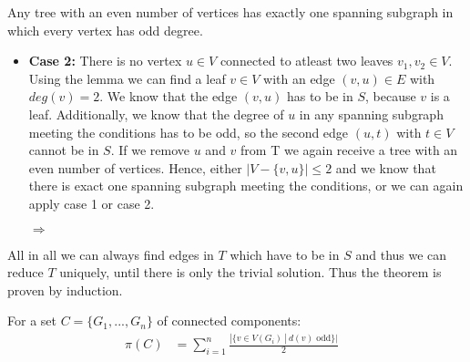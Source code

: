 \documentclass[a4paper]{article}
\begin{document}
\begin{solution}{6}
\begin{theorem}{Any tree with an even number of vertices has exactly one spanning subgraph in which every vertex has odd degree.}
\begin{itemize}
				
				\item \textbf{Case 2:} There is no vertex $u \in V$ connected to atleast two leaves $v_1, v_2 \in V$. \\
				Using the lemma we can find a leaf $v \in V$ with an edge $(v,u) \in E$ with $deg(v)=2$. 
				We know that the edge $(v,u)$ has to be in $S$, because $v$ is a leaf. 
				Additionally, we know that the degree of $u$ in any spanning subgraph meeting the conditions has to be odd, so the second edge $(u,t)$ with $t \in V$ cannot be in $S$. 
				If we remove $u$ and $v$ from T we again receive a tree with an even number of vertices. 
				Hence, either $|V- \{v,u\}| \leq 2$ and we know that there is exact one spanning subgraph meeting the conditions, or we can again apply case 1 or case 2. 
				\begin{center}
				 $\Rightarrow$
			\end{center}
			
			
			\end{itemize}
		
		All in all we can always find edges in $T$ which have to be in $S$ and thus we can reduce $T$ uniquely, until there is only the trivial solution. 
		Thus the theorem is proven by induction. 
		\end{theorem}
	\end{solution} 
	\newpage
	\begin{solution}{7}
		For a set $C = \{G_1, ..., G_n\}$ of connected components:\\
		\begin{align}
			\pi(C)&= \sum_{i = 1}^n \frac{|\{v \in V(G_i)\ |\ d(v) \text{ odd}\}|}{2}&
		\end{align}
	\end{solution} 
	\newpage
	\begin{solution}{8}
		
	\end{solution}
	
\end{document}
